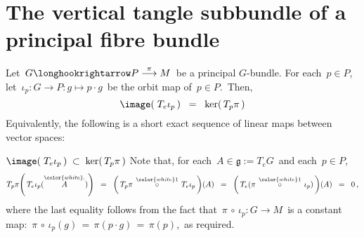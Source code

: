 

\section{The vertical tangle subbundle of a principal fibre bundle}
\setcounter{theorem}{0}
\setcounter{equation}{0}


\renewcommand{\theenumi}{\roman{enumi}}
\renewcommand{\labelenumi}{\textnormal{(\theenumi)}$\;\;$}


\begin{proposition}
\mbox{}
\vskip 0.2cm
\noindent
Let \,$G \longhookrightarrow P \overset{\pi}{\longrightarrow} M$\, be a principal $G$-bundle.
For each \,$p \in P$,\, let \,$\iota_{p} : G \longrightarrow P : g \longmapsto p \cdot g$\, be the orbit map of \,$p \in P$.\,
Then,
\begin{equation*}
\image\!\left(\;T_{e}\iota_{p}\,\right) \;\; = \;\; \ker\!\left(\,T_{p}\pi\,\right)
\end{equation*}
Equivalently, the following is a short exact sequence of linear maps between vector spaces:
\begin{center}
\end{center}
\end{proposition}
\proof
\vskip 0.3cm
\noindent
\underline{$\image\!\left(\;T_{e}\iota_{p}\,\right) \;\subset\; \ker\!\left(\,T_{p}\pi\,\right)$}
\vskip 0.2cm
\noindent
Note that, for each \,$A \in \mathfrak{g} := T_{e}G$\, and each \,$p \in P$,\,
\begin{equation*}
T_{p}\pi\!\left(\,T_{e}\iota_{p}(\overset{{\color{white}.}}{A})\right)
\;\; = \;\;
	\left(\,T_{p}\pi \,\overset{{\color{white}1}}{\circ}\, T_{e}\iota_{p}\,\right)\!(A)
\;\; = \;\;
	\left(\,T_{e}(\pi\,\overset{{\color{white}1}}{\circ}\,\iota_{p})\,\right)\!(A)
\;\; = \;\;
	0\,,
\end{equation*}
where the last equality follows from the fact that
\,$\pi\,\circ\,\iota_{p} : G \longrightarrow M$\,
is a constant map:
\,$\pi\,\circ\,\iota_{p}(g) \,=\, \pi(p \cdot g) \,=\, \pi(p)$,\,
as required.

